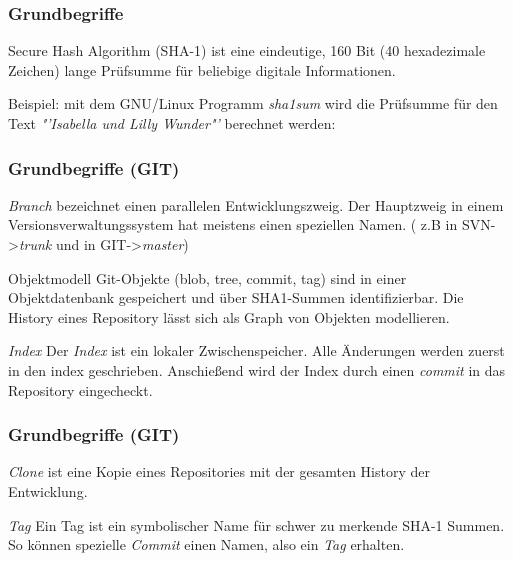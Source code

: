 \documentclass{beamer}
\begin{document}
\begin{frame}\frametitle{Grundbegriffe}
\begin{block}{Secure Hash Algorithm (SHA-1)}
ist eine eindeutige, 160 Bit (40 hexadezimale Zeichen) lange Prüfsumme für beliebige digitale Informationen.
\end{block}

\begin{exampleblock}{Beispiel:}
mit dem GNU/Linux Programm \textit{sha1sum} wird die Prüfsumme für den Text \textit{"'Isabella und Lilly Wunder"'} berechnet werden:

\end{exampleblock}

\end{frame}
\begin{frame}\frametitle{Grundbegriffe (GIT)}

\begin{block}{\textit{Branch}}
bezeichnet einen parallelen Entwicklungszweig. Der Hauptzweig in einem Versionsverwaltungssystem hat meistens einen speziellen Namen. ( z.B in SVN->\textit{trunk} und in GIT->\textit{master})
\end{block}

\begin{block}{Objektmodell}
Git-Objekte (blob, tree, commit, tag) sind in einer Objektdatenbank gespeichert und über SHA1-Summen identifizierbar. Die History eines Repository lässt sich als Graph von Objekten modellieren.
\end{block}

\begin{block}{\textit{Index}}
Der \textit{Index} ist ein lokaler Zwischenspeicher. Alle Änderungen werden zuerst in den index geschrieben. Anschießend wird der Index durch einen \textit{commit} in das Repository eingecheckt. 
\end{block}

\end{frame}
\begin{frame}\frametitle{Grundbegriffe (GIT)}

\begin{block}{\textit{Clone}}
ist eine Kopie eines Repositories mit der gesamten History der Entwicklung.
\end{block}

\begin{block}{\textit{Tag}}
Ein Tag ist ein symbolischer Name für schwer zu merkende SHA-1 Summen. So können spezielle \textit{Commit} einen Namen, also ein \textit{Tag} erhalten. 
\end{block}

\end{frame}
\end{document}
